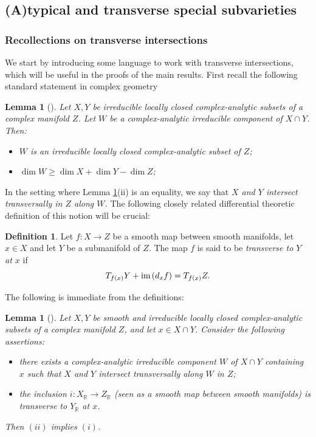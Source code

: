 \documentclass[10pt]{article}
\numberwithin{equation}{subsection}
\theoremstyle{plain}
\newtheorem{lemma}[theorem]{Lemma}
\theoremstyle{definition}
\newtheorem{definition}[theorem]{Definition}
\theoremstyle{remark}
\newcommand{\R}{\mathbb R}
\newcommand{\im}{\mathrm{im} \hspace{0.05cm}}
\begin{document}
\subsection{(A)typical and transverse special subvarieties}
\subsubsection*{Recollections on transverse intersections}
We start by introducing some language to work with transverse intersections, which will be useful in the proofs of the main results. First recall the following standard statement in complex geometry
\begin{lemma}[{\cite[Thm. II.6.2, Prop. II.4.32]{demaillybook}}]\label{intersection}
Let $X,Y$ be irreducible locally closed complex-analytic subsets of a complex manifold $Z$. Let $W$ be a complex-analytic irreducible component of $X \cap Y$. Then:
\begin{itemize}
\item[(i)] $W$ is an irreducible locally closed complex-analytic subset of $Z$;
\item[(ii)] $\dim W \geqslant \dim X + \dim Y - \dim Z$;
\end{itemize}
\end{lemma}
In the setting where Lemma \ref{intersection}(ii) is an equality, we say that \textit{$X$ and $Y$ intersect transversally in $Z$ along $W$.} The following closely related differential theoretic definition of this notion will be crucial:
\begin{definition}
Let $f : X \rightarrow Z$ be a smooth map between smooth manifolds, let $x \in X$ and let $Y$ be a submanifold of $Z$. The map $f$ is said to be \textit{transverse to $Y$ at $x$} if 
\[
T_{f(x)} Y + \im(d_x f) = T_{f(x)} Z.
\]
\end{definition}
The following is immediate from the definitions:
\begin{lemma}[{\cite[Chap. I,\S 5.]{pollguill}}]\label{equivdifftrans}
Let $X,Y$ be smooth and irreducible locally closed complex-analytic subsets of a complex manifold $Z$, and let $x \in X \cap Y$. Consider the following assertions:
\begin{itemize}
\item[(i)] there exists a complex-analytic irreducible component $W$ of $X \cap Y$ containing $x$ such that $X$ and $Y$ intersect transversally along $W$ in $Z$;
\item[(ii)] the inclusion $i : X_\R \rightarrow Z_\R$ (seen as a smooth map between smooth manifolds) is transverse to $Y_\R$ at $x$.
\end{itemize}
Then $(ii)$ implies $(i)$.
\end{lemma}
\end{document}
